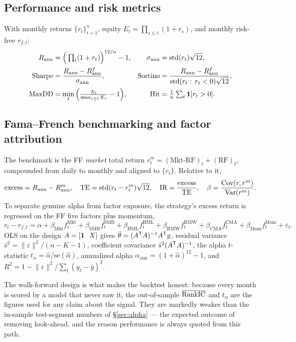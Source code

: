 \documentclass[11pt]{article}
\begin{document}
\subsection{Performance and risk metrics}
With monthly returns $\{r_t\}_{t=1}^n$, equity $E_t=\prod_{s\le t}(1+r_s)$, and
monthly risk-free $r_{f,t}$:
\begin{align}
  R_{\text{ann}}&=\Big(\textstyle\prod_t(1+r_t)\Big)^{12/n}-1, &
  \sigma_{\text{ann}}&=\operatorname{std}(r_t)\sqrt{12}, \\
  \text{Sharpe}&=\frac{R_{\text{ann}}-R^{f}_{\text{ann}}}{\sigma_{\text{ann}}}, &
  \text{Sortino}&=\frac{R_{\text{ann}}-R^{f}_{\text{ann}}}{\operatorname{std}(r_t:\,r_t<0)\sqrt{12}}, \\
  \text{MaxDD}&=\min_t\Big(\tfrac{E_t}{\max_{s\le t}E_s}-1\Big), &
  \text{Hit}&=\tfrac1n\textstyle\sum_t \mathbf 1[r_t>0].
\end{align}

\subsection{Fama--French benchmarking and factor attribution}
The benchmark is the FF \emph{market} total return
$r^m_t=(\text{Mkt-RF})_t+(\text{RF})_t$, compounded from daily
 to monthly and aligned to $\{r_t\}$. Relative to it,
\begin{equation}
  \text{excess}=R_{\text{ann}}-R^m_{\text{ann}},\quad
  \text{TE}=\operatorname{std}(r_t-r^m_t)\sqrt{12},\quad
  \text{IR}=\frac{\text{excess}}{\text{TE}},\quad
  \beta=\frac{\operatorname{Cov}(r,r^m)}{\operatorname{Var}(r^m)} .
\end{equation}
To separate genuine alpha from factor exposure, the strategy's excess return is
regressed on the FF five factors plus momentum,
\begin{equation}
  r_t-r_{f,t}=\alpha
  +\beta_{\text{Mkt}}f^{\text{Mkt}}_t+\beta_{\text{SMB}}f^{\text{SMB}}_t
  +\beta_{\text{HML}}f^{\text{HML}}_t+\beta_{\text{RMW}}f^{\text{RMW}}_t
  +\beta_{\text{CMA}}f^{\text{CMA}}_t+\beta_{\text{Mom}}f^{\text{Mom}}_t+\varepsilon_t .
\end{equation}
OLS on the design $A=[\mathbf{1}\ \ X]$ gives $\hat\theta=(A^{\mathsf{T}} A)^{-1}A^{\mathsf{T}} y$, residual
variance $\hat s^2=\lVert\varepsilon\rVert^2/(n-K-1)$, coefficient covariance
$\hat s^2(A^{\mathsf{T}} A)^{-1}$, the alpha $t$-statistic
$t_\alpha=\hat\alpha/\mathrm{se}(\hat\alpha)$, annualized alpha
$\alpha_{\text{ann}}=(1+\hat\alpha)^{12}-1$, and
$R^2=1-\lVert\varepsilon\rVert^2/\sum_t(y_t-\bar y)^2$.

\begin{keybox}[Interpretation]
The walk-forward design is what makes the backtest honest: because every month is
scored by a model that never saw it, the out-of-sample $\overline{\mathrm{RankIC}}$ and
$t_\alpha$ are the figures used for any claim about the signal. They are markedly
weaker than the in-sample test-segment numbers of \S\ref{sec:alpha} --- the
expected outcome of removing look-ahead, and the reason performance is always
quoted from this path.
\end{keybox}
\end{document}
